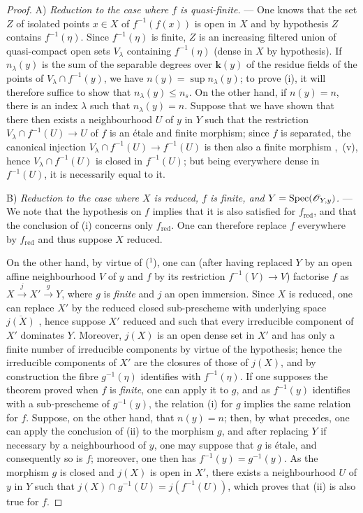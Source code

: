 \begin{proof}
A) \emph{Reduction to the case where $f$ is quasi-finite.} ---
One knows  that the set $Z$ of isolated points $x\in X$ of $f^{-1}(f(x))$ is open in $X$ and by hypothesis $Z$ contains $f^{-1}(\eta)$.
Since $f^{-1}(\eta)$ is finite, $Z$ is an increasing filtered union of quasi-compact open sets $V_\lambda$ containing $f^{-1}(\eta)$ (dense in $X$ by hypothesis).
If $n_\lambda(y)$ is the sum of the separable degrees over $\boldsymbol{k}(y)$ of the residue fields of the points of $V_\lambda\cap f^{-1}(y)$, we have $n(y)=\sup n_\lambda(y)$; to prove (i), it will therefore suffice to show that $n_\lambda(y)\leq n_s$.
On the other hand, if $n(y)=n$, there is an index $\lambda$ such that $n_\lambda(y)=n$. Suppose that we have shown that there then exists a neighbourhood $U$ of $y$ in $Y$ such that the restriction $V_\lambda\cap f^{-1}(U)\to U$ of $f$ is an \'etale and finite morphism; since $f$ is separated, the canonical injection $V_\lambda\cap f^{-1}(U)\to f^{-1}(U)$ is then also a finite morphism ,~(v), hence $V_\lambda\cap f^{-1}(U)$ is closed in $f^{-1}(U)$; but being everywhere dense in $f^{-1}(U)$, it is necessarily equal to it.

B) \emph{Reduction to the case where $X$ is reduced, $f$ is finite, and $Y=\operatorname{Spec}(\mathscr{O}_{Y,y})$.} ---
We note that the hypothesis on $f$ implies that it is also satisfied for $f_{\mathrm{red}}$, and that the conclusion of (i) concerns only $f_{\mathrm{red}}$.
One can therefore replace $f$ everywhere by $f_{\mathrm{red}}$ and thus suppose $X$ reduced.

On the other hand, by virtue of  (${}^1$), one can (after having replaced $Y$ by an open affine neighbourhood $V$ of $y$ and $f$ by its restriction $f^{-1}(V)\to V$) factorise $f$ as $X\xrightarrow{j}X'\xrightarrow{g}Y$, where $g$ is \emph{finite} and $j$ an open immersion.
Since $X$ is reduced, one can replace $X'$ by the reduced closed sub-prescheme with underlying space $\overline{j(X)}$ , hence suppose $X'$ reduced and such that every irreducible component of $X'$ dominates $Y$.
Moreover, $j(X)$ is an open dense set in $X'$ and has only a finite number of irreducible components by virtue of the hypothesis; hence  the irreducible components of $X'$ are the closures of those of $j(X)$, and by construction the fibre $g^{-1}(\eta)$ identifies with $f^{-1}(\eta)$.
If one supposes the theorem proved when $f$ is \emph{finite}, one can apply it to $g$, and as $f^{-1}(y)$ identifies with a sub-prescheme of $g^{-1}(y)$, the relation (i) for $g$ implies the same relation for $f$.
Suppose, on the other hand, that $n(y)=n$; then, by what precedes, one can apply the conclusion of (ii) to the morphism $g$, and after replacing $Y$ if necessary by a neighbourhood of $y$, one may suppose that $g$ is \'etale, and consequently so is $f$; moreover, one then has $f^{-1}(y)=g^{-1}(y)$.
As the morphism $g$ is closed and $j(X)$ is open in $X'$, there exists a neighbourhood $U$ of $y$ in $Y$ such that $j(X)\cap g^{-1}(U)=j(f^{-1}(U))$, which proves that (ii) is also true for $f$.


\end{proof}
